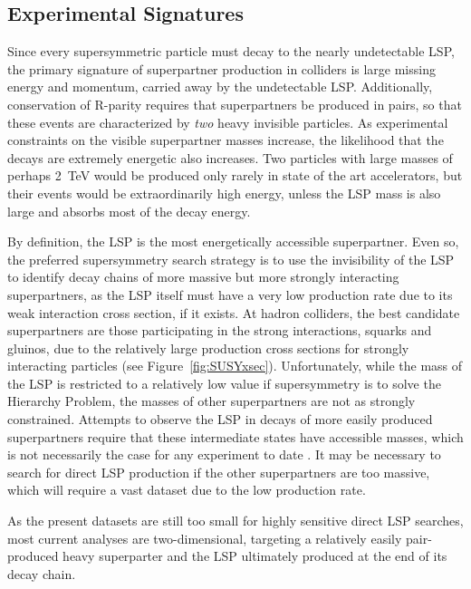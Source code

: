   \subsection{Experimental Signatures} \label{sec:SUSYexp}

  Since every supersymmetric particle must decay to the nearly undetectable LSP, the primary signature of superpartner production in colliders is large missing energy and momentum, carried away by the undetectable LSP.
  Additionally, conservation of R-parity requires that superpartners be produced in pairs, so that these events are characterized by {\it two} heavy invisible particles.
  As experimental constraints on the visible superpartner masses increase, the likelihood that the decays are extremely energetic also increases.
  Two particles with large masses of perhaps 2~TeV would be produced only rarely in state of the art accelerators, but their events would be extraordinarily high energy, unless the LSP mass is also large and absorbs most of the decay energy.

  By definition, the LSP is the most energetically accessible superpartner.
  Even so, the preferred supersymmetry search strategy is to use the invisibility of the LSP to identify decay chains of more massive but more strongly interacting superpartners, as the LSP itself must  have a very low production rate due to its weak interaction cross section, if it exists.
  At hadron colliders, the best candidate superpartners are those participating in the strong interactions, squarks and gluinos, due to the relatively large production cross sections for strongly interacting particles (see Figure~\ref{fig:SUSYxsec}). 
  Unfortunately, while the mass of the LSP is restricted to a relatively low value if supersymmetry is to solve the Hierarchy Problem, the masses of other superpartners are not as strongly constrained.
  Attempts to observe the LSP in decays of more easily produced superpartners require that these intermediate states have accessible masses, which is not necessarily the case for any experiment to date \cite{SUSYnaturalness,naturalWIMP}.
  It may be necessary to search for direct LSP production if the other superpartners are too massive, which will require a vast dataset due to the low production rate.

  As the present datasets are still too small for highly sensitive direct LSP searches, most current analyses are two-dimensional, targeting a relatively easily pair-produced heavy superparter and the LSP ultimately produced at the end of its decay chain.

